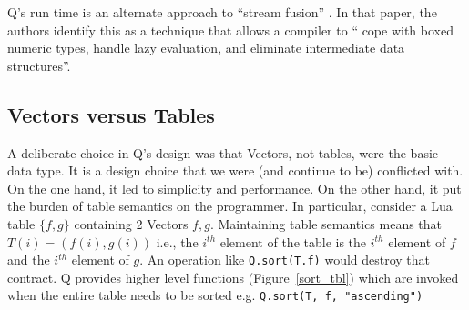 Q's run time is an alternate approach to ``stream fusion''
\cite{Mainland2017}. In
that paper, the authors identify this as a technique that allows a compiler to
`` cope with boxed numeric types, handle lazy evaluation, and
eliminate intermediate data structures''.
\subsection{Vectors versus Tables}
\label{vectors_versus_tables}

A deliberate choice in Q's design was that Vectors, not tables, were the basic
data type. It is a design choice that we were (and continue to be) conflicted with. On the one hand,
it led to simplicity and performance. On the other hand, it put the burden of
table semantics on the programmer. In particular, consider a 
Lua table \(\{f, g\}\) containing 2 Vectors \(f, g\). Maintaining table
semantics means that \(T(i) = (f(i), g(i))\)  i.e., the \(i^{th}\) element of
the table is the \(i^{th}\) element of \(f\) and the \(i^{th}\) element of \(g\). An 
operation like {\tt Q.sort(T.f)} would destroy that contract. Q
provides higher level functions (Figure~\ref{sort_tbl}) which are invoked when the entire table needs to
be sorted e.g. {\tt Q.sort(T, f, "ascending")} 

\begin{figure}[hbtp]
\centering
{}
\end{figure}

